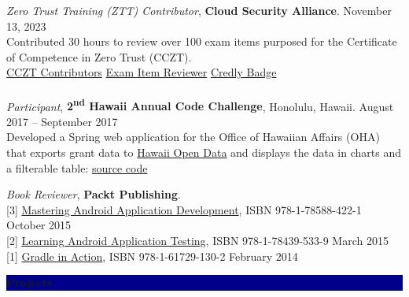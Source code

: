 \documentclass[10pt]{res} %
\begin{document}
\begin{resume}
{\sl Zero Trust Training (ZTT) Contributor}, {\bf Cloud Security Alliance}. \hfill November 13, 2023 \\
Contributed 30 hours to review over 100 exam items purposed for the Certificate of Competence in Zero Trust (CCZT). \\
\hspace*{1em} \faGlobe[light]\space \href{https://cloudsecurityalliance.org/education/cczt/contributors}{\color{blue}CCZT Contributors} \faAward\space \href{https://bjdelacruz.dev/files/cczt-exam-item-reviewer.pdf}{\color{blue}Exam Item Reviewer} \faAward\space \href{https://www.credly.com/badges/d9dd6a28-4c55-4fd8-a7d6-913739f322b1}{\color{blue}Credly Badge} \\ \\
{\sl Participant}, {\bf 2\textsuperscript{nd} Hawaii Annual Code Challenge}, Honolulu, Hawaii. \hfill August 2017 -- September 2017 \\
Developed a Spring web application for the Office of Hawaiian Affairs (OHA) that exports grant data to \href{https://opendata.hawaii.gov}{\color{blue}Hawaii Open Data} and displays the data in charts and a filterable table: \href{https://github.com/HACC17/Team-HIC}{\color{blue}source code}

{\sl Book Reviewer}, {\bf Packt Publishing}. \\
{[3]} \href{https://www.packtpub.com/application-development/mastering-android-application-development}{\color{blue}Mastering Android Application Development}, ISBN 978-1-78588-422-1 \hfill October 2015 \\
{[2]} \href{https://www.packtpub.com/application-development/learning-android-application-testing}{\color{blue}Learning Android Application Testing}, ISBN 978-1-78439-533-9 \hfill March 2015 \\
{[1]} \href{http://www.manning.com/muschko}{\color{blue}Gradle in Action}, ISBN 978-1-61729-130-2 \hfill February 2014


\vspace{0.025in}

\colorbox{darkblue}{\color{white}\centerline{\bf Projects}}


\end{resume}
\end{document}

